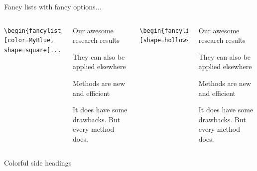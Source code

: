 \documentclass[xetex, aspectratio=169,professionalfont]{beamer}
\begin{document}
\begin{frame}[fragile]{Fancy lists with fancy options...}
	\begin{columns}
		\centering
\begin{lstlisting}
\begin{fancylist}[color=MyBlue, shape=square]...
\end{lstlisting}

		\begin{fancylist}[color=MyBlue, shape=square]
			\item Our awesome research results
			\item They can also be applied elsewhere
			\item Methods are new and efficient
			\item It does have some drawbacks. But every method does.
		\end{fancylist} 
		
		\centering
\begin{lstlisting}
\begin{fancylist}[shape=hollowsquare]...
\end{lstlisting}
		\begin{fancylist}[shape=hollowsquare]
			\item Our awesome research results
			\item They can also be applied elsewhere
			\item Methods are new and efficient
			\item It does have some drawbacks. But every method does.
		\end{fancylist} 
	\end{columns}
\end{frame}

\begin{frame}[fragile]{Colorful side headings}

\end{frame}
\end{document}
